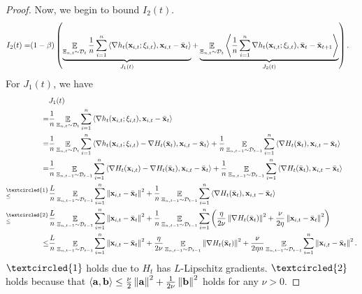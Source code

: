\documentclass{article}
\begin{document}
\begin{proof}
Now, we begin to bound $I_2(t)$.
\begin{align}
\nonumber
I_2(t) = & (1-\beta)  \left( \underbrace{ \mathop{\mathbb{E}}_{ \Xi_{n,t} \sim \mathcal{D}_{t} }\frac{1}{n}\sum_{i=1}^n\left\langle\nabla h_t({\bf x}_{i,t}; \xi_{i,t}), {\bf x}_{i,t} - \bar{{\bf x}}_t  \right\rangle }_{J_1(t)} +  \underbrace{ \mathop{\mathbb{E}}_{ \Xi_{n,t} \sim \mathcal{D}_{t} }\left\langle\frac{1}{n}\sum_{i=1}^n \nabla h_t({\bf x}_{i,t};\xi_{i,t}), \bar{{\bf x}}_t - \bar{{\bf x}}_{t+1}  \right\rangle}_{J_2(t)} \right).
\end{align} For $J_1(t)$, we have
\begin{align}
\nonumber
& J_1(t) \\ \nonumber 
= & \frac{1}{n}\EE_{ \Xi_{n,t} \sim \Dcal_{t} }\sum_{i=1}^n\lrangle{\nabla h_t(\x_{i,t}; \xi_{i,t}), \x_{i,t} - \bar{\x}_t } \\ \nonumber
= & \frac{1}{n}\EE_{ \Xi_{n,t} \sim \Dcal_{t} } \sum_{i=1}^n\lrangle{\nabla h_t(\x_{i,t}; \xi_{i,t}) - \nabla H_t(\bar{\x}_t), \x_{i,t} - \bar{\x}_t } + \frac{1}{n}\EE_{ \Xi_{n,t-1} \sim \Dcal_{t-1} }\sum_{i=1}^n\lrangle{\nabla H_t(\bar{\x}_t), \x_{i,t} - \bar{\x}_t } \\ \nonumber
= & \frac{1}{n}\EE_{ \Xi_{n,t-1} \sim \Dcal_{t-1} }\sum_{i=1}^n\lrangle{\nabla H_t(\x_{i,t}) - \nabla H_t(\bar{\x}_t), \x_{i,t} - \bar{\x}_t } + \frac{1}{n}\EE_{ \Xi_{n,t-1} \sim \Dcal_{t-1} }\sum_{i=1}^n\lrangle{\nabla H_t(\bar{\x}_t), \x_{i,t} - \bar{\x}_t } \\ \nonumber
\refabovecir{\le}{\textcircled{1}} & \frac{L}{n}\EE_{ \Xi_{n,t-1} \sim \Dcal_{t-1} }\sum_{i=1}^n \lrnorm{\x_{i,t} - \bar{\x}_t}^2 + \frac{1}{n}\EE_{ \Xi_{n,t-1} \sim \Dcal_{t-1} }\sum_{i=1}^n\lrangle{\nabla H_t(\bar{\x}_t), \x_{i,t} - \bar{\x}_t } \\ \nonumber
\refabovecir{\le}{\textcircled{2}} & \frac{L}{n}\EE_{ \Xi_{n,t-1} \sim \Dcal_{t-1} }\sum_{i=1}^n \lrnorm{\x_{i,t} - \bar{\x}_t}^2 + \frac{1}{n}\EE_{ \Xi_{n,t-1} \sim \Dcal_{t-1} }\sum_{i=1}^n\lrincir{\frac{\eta}{2\nu}\lrnorm{\nabla H_t(\bar{\x}_t)}^2 + \frac{\nu}{2\eta}\lrnorm{\x_{i,t} - \bar{\x}_t }^2 } \\ \label{equa_theorem_temp0}
\le & \frac{L}{n}\EE_{ \Xi_{n,t-1} \sim \Dcal_{t-1} }\sum_{i=1}^n \lrnorm{\x_{i,t} - \bar{\x}_t}^2 + \frac{\eta}{2\nu}\EE_{ \Xi_{n,t-1} \sim \Dcal_{t-1} }\lrnorm{\nabla H_t(\bar{\x}_t)}^2 + \frac{\nu}{2\eta n}\EE_{ \Xi_{n,t-1} \sim \Dcal_{t-1} }\sum_{i=1}^n\lrnorm{\x_{i,t} - \bar{\x}_t }^2. 
\end{align} $\textcircled{1}$ holds due to $H_t$ has $L$-Lipschitz gradients. $\textcircled{2}$ holds because that $\left\langle{\bf a},{\bf b} \right\rangle \le \frac{\nu}{2}\left\lVert{\bf a}\right\rVert^2 + \frac{1}{2\nu}\left\lVert{\bf b}\right\rVert^2$ holds for any $\nu>0$. 



\end{proof}
\end{document}
